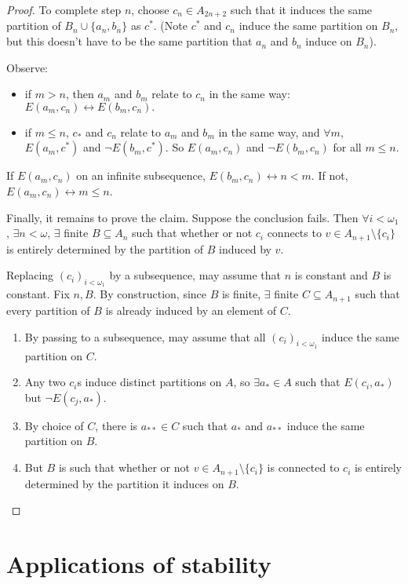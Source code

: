 \documentclass{article}
\begin{document}
\begin{proof}
  To complete step $n$, choose $c_n \in A_{2n+2}$ such that it induces the same partition of $B_n \cup \{a_n, b_n\}$ as $c^*$. (Note $c^*$ and $c_n$ induce the same partition on $B_n$, but this doesn't have to be the same partition that $a_n$ and $b_n$ induce on $B_n$).

  Observe:
  \begin{itemize}
    \item if $m > n$, then $a_m$ and $b_m$ relate to $c_n$ in the same way: $E(a_m ,c_n) \leftrightarrow E(b_m, c_n).$ %
    \item if $m \leq n$, $c_*$ and $c_n$ relate to $a_m$ and $b_m$ in the same way, and $\forall m$, $E(a_m, c^*)$ and $\neg E(b_m, c^*)$. %
      So $E(a_m, c_n)$ and $\neg E(b_m, c_n)$ for all $m \leq n$.
  \end{itemize}

  If $ E(a_m, c_n)$ on an infinite subsequence, $E(b_m, c_n) \leftrightarrow n < m$. If not, $E(a_m, c_n) \leftrightarrow m \leq n$.

  Finally, it remains to prove the claim.
  Suppose the conclusion fails. Then $\forall i < \omega_1$, $\exists n < \omega$, $\exists$ finite $B \subseteq A_n$ such that whether or not $c_i$ connects to $v \in A_{n+1} \setminus \{c_i\}$ is entirely determined by the partition of $B$ induced by $v$.

  Replacing $(c_i)_{i<\omega_1}$ by a subsequence, may assume that $n$ is constant and $B$ is constant. Fix $n,B$.
  By construction, since $B$ is finite, $\exists$ finite $C \subseteq A_{n+1}$ such that every partition of $B$ is already induced by an element of $C$.
  \begin{enumerate}[label=(\arabic*)]
    \item By passing to a subsequence, may assume that all $(c_i)_{i < \omega_1}$ induce the same partition on $C$.
    \item Any two $c_i$s induce distinct partitions on $A$, so $\exists a_* \in A$ such that $E(c_i, a_*)$ but $\neg E(c_j, a_*)$.
    \item By choice of $C$, there is $a_{**} \in C$ such that $a_*$ and $a_{**}$ induce the same partition on $B$.
    \item But $B$ is such that whether or not $v \in A_{n+1} \setminus \{c_i\}$ is connected to $c_i$ is entirely determined by the partition it induces on $B$.
  \end{enumerate}

\end{proof}
\section{Applications of stability}
\end{document}
